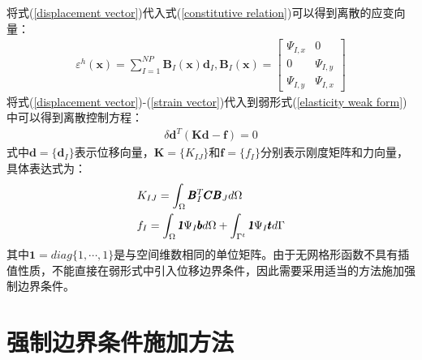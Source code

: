 将式(\ref{displacement vector})代入式(\ref{constitutive relation})可以得到离散的应变向量：
\begin{equation}\label{strain vector}
\begin{split}
    \varepsilon^h(\pmb{x})=\sum_{I=1}^{N\!P}\pmb{B}_I(\pmb{x})\pmb{d}_I,\pmb{B}_I(\pmb{x})= \left[\begin{matrix}\Psi_{I,x}&0\\0&\Psi_{I,y}\\\Psi_{I,y}&\Psi_{I,x} \end{matrix}\right] 
\end{split}
\end{equation}
将式(\ref{displacement vector})-(\ref{strain vector})代入到弱形式(\ref{elasticity weak form})中可以得到离散控制方程：
\begin{equation}
\begin{split}
    \delta\pmb{d}^T(\pmb{K}\pmb{d}-\pmb{f})=0
\end{split}
\end{equation}
式中$\pmb{d}=\{\pmb d_I\}$表示位移向量，$\pmb{K}=\{K_{IJ}\}$和$\pmb{f}=\{f_I\}$分别表示刚度矩阵和力向量，具体表达式为：
\begin{equation}
\begin{split}\label{KIJ}
        &K_{IJ}=\int_{\Omega}\pmb{B}_I^T\pmb{C}\pmb{B}_Jd\Omega\\
        &f_I=\int_{\Omega}\pmb{\textsl{1}}\Psi_I\pmb{b}d\Omega+\int_{\Gamma^t}\pmb{\textsl{1}}\Psi_I\pmb{t}d\Gamma
\end{split}
\end{equation}
其中$\pmb{1}=diag\{1,\dotsb,1\}$是与空间维数相同的单位矩阵。由于无网格形函数不具有插值性质，不能直接在弱形式中引入位移边界条件，因此需要采用适当的方法施加强制边界条件。
\section{强制边界条件施加方法}
